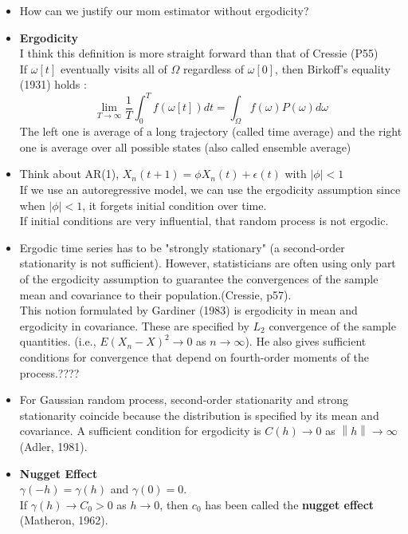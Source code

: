 \documentclass[11pt]{article}
\begin{document}
\begin{itemize}
\item How can we justify our mom estimator without ergodicity?\\

\item 
\textbf{Ergodicity}\\
I think this definition is more straight forward than that of Cressie (P55)\\
If $\omega[t]$ eventually visits all of $\Omega$ regardless of $\omega[0]$, then Birkoff's equality (1931) holds :\\
$$\lim_{T \rightarrow \infty} \frac{1}{T} \int_{0}^{T}f(\omega [t])dt = \int_{\Omega}f(\omega)P(\omega)d\omega$$  
The left one is average of a long trajectory (called time average) and the right one is average over all possible states (also called ensemble average)\\


\item 
Think about AR(1), $X_n(t+1) = \phi X_n(t) + \epsilon(t)$ with $|\phi| <1$\\
If we use an autoregressive model, we can use the ergodicity assumption since when $|\phi| <1$, it forgets initial condition over time.\\
If initial conditions are very influential, that random process is not ergodic.\\

\item 
Ergodic time series has to be "strongly stationary" (a second-order stationarity is not sufficient). However, statisticians are often using only part of the ergodicity assumption to guarantee the convergences of the sample mean and covariance to their population.(Cressie, p57).\\
This notion formulated by Gardiner (1983) is ergodicity in mean and ergodicity in covariance. These are specified by $L_2$ convergence of the sample quantities. (i.e., $E(X_n - X)^2 \rightarrow 0$ as $n \rightarrow \infty$). {\color{red} He also gives sufficient conditions for convergence that depend on fourth-order moments of the process.????}\\

\item
For Gaussian random process, second-order stationarity and strong stationarity coincide because the distribution is specified by its mean and covariance. A sufficient condition for ergodicity is $C(h) \rightarrow 0$ as $\left \| h \right \| \rightarrow \infty$ (Adler, 1981).

\item
\textbf{Nugget Effect}\\
$\gamma(-h) = \gamma(h)$ and $\gamma(0)=0$.\\
If $\gamma(h) \rightarrow C_0 > 0$ as $h \rightarrow 0$, then $c_0$ has been called the \textbf{nugget effect} (Matheron, 1962).\\


\end{itemize}
\end{document}
